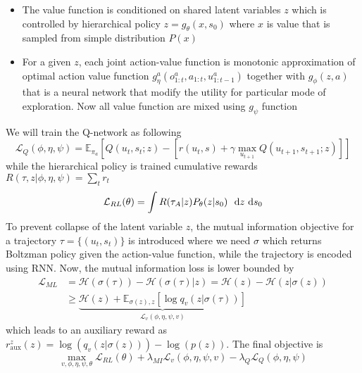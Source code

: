 \begin{itemize}
    \item The value function is conditioned on shared latent variables $z$ which is controlled by hierarchical policy $z = g_\theta(x, s_0)$ where $x$ is value that is sampled from simple distribution $P(x)$
    \item For a given $z$, each joint action-value function is monotonic approximation of optimal action value function $g_{\eta}^a(o^a_{1:t}, a_{1:t}, u^{a}_{1:t-1})$ together with $g_{\phi}(z, a)$ that is a neural network that modify the utility for particular mode of exploration. Now all value function are mixed using $g_{\psi}$ function 
\end{itemize}
We will train the Q-network as following 
\begin{equation}
    \mathcal{L}_{Q}(\phi, \eta,\psi) = \mathbb{E}_{\pi_a}  \left[ Q(u_t, s_t ; z) - \left[r(u_t, s) + \gamma \max_{u_{t+1}} Q(u_{t+1}, s_{t+1} ; z)\right] \right]
\end{equation}
while the hierarchical policy is trained cumulative rewards $R(\tau, z | \phi, \eta, \psi)= \sum_t r_t$ 
\begin{equation}
    \mathcal{L}_{RL}(\theta) = \int R(\tau_A | z)P_{\theta}(z | s_0) \ \ \mathrm{d} z\ \mathrm{d} s_0
\end{equation}
To prevent collapse of the latent variable $z$, the mutual information objective for a trajectory $\tau = \{(u_t, s_t)\}$ is introduced where we need $\sigma$ which returns Boltzman policy given the action-value function, while the trajectory is encoded using RNN. Now, the mutual information loss is lower bounded by
\begin{equation}
\begin{aligned}
    \mathcal{L}_{ML} &= \mathcal{H}(\sigma(\tau)) - \mathcal{H}(\sigma(\tau) | z) = \mathcal{H}(z) - \mathcal{H}(z | \sigma(z)) \\
    &\ge \underbrace{\mathcal{H}(z) + \mathbb{E}_{\sigma(z), z} \left[ \log q_v(z | \sigma(\tau)) \right]}_{\mathcal{L}_v(\phi, \eta, \psi, v)}
\end{aligned}
\end{equation}
which leads to an auxiliary reward as $r^z_{\text{aux}} (z) = \log(q_v(z | \sigma(z))) - \log  (p(z))$. The final objective is 
\begin{equation}
    \max_{v, \phi, \eta, \psi, \theta} \mathcal{L}_{RL}(\theta) + \lambda_{MI}\mathcal{L}_v(\phi, \eta, \psi, v) - \lambda_{Q}\mathcal{L}_{Q}(\phi, \eta,\psi)
\end{equation}